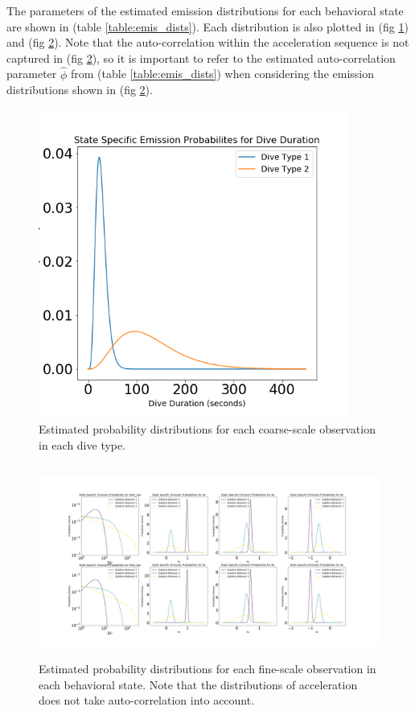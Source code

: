 The parameters of the estimated emission distributions for each behavioral state are shown in (table \ref{table:emis_dists}). Each distribution is also plotted in (fig \ref{fig:coarse_emis}) and (fig \ref{fig:fine_emis}). Note that the auto-correlation within the acceleration sequence is not captured in (fig \ref{fig:fine_emis}), so it is important to refer to the estimated auto-correlation parameter $\hat \phi$ from (table \ref{table:emis_dists}) when considering the emission distributions shown in (fig \ref{fig:fine_emis}).
%
\begin{figure}[ht]
	\centering
	\includegraphics[height=4in]{../Plots/coarse-emissions.png}
	\caption{Estimated probability distributions for each coarse-scale observation in each dive type.}
	\label{fig:coarse_emis}
\end{figure}
%
\begin{figure}[ht]
	\centering
	\includegraphics[height=2.5in]{../Plots/fine-emissions.png}
	\caption{Estimated probability distributions for each fine-scale observation in each behavioral state. Note that the distributions of acceleration does not take auto-correlation into account.}
	\label{fig:fine_emis}
\end{figure}
